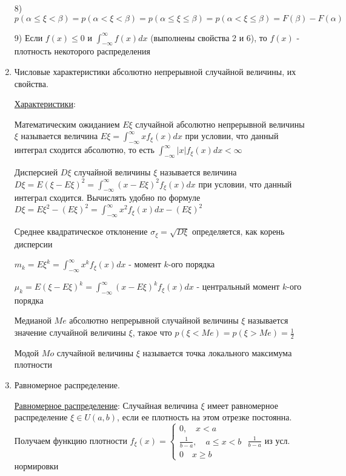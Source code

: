 \begin{enumerate}
    8) $p(\alpha \leq \xi < \beta) = p(\alpha < \xi < \beta) = p(\alpha \leq \xi \leq \beta) = p(\alpha < \xi \leq \beta) = F(\beta) - F(\alpha)$

    9) \Ths Если $f(x) \leq 0$ и $\int_{-\infty}^{\infty} f(x)dx$ (выполнены свойства 2 и 6), то $f(x)$ - плотность некоторого распределения

    \item Числовые характеристики абсолютно непрерывной случайной величины, их свойства.

    \hyperlink{attributesofcontinuousrandomvariable}{Характеристики}:

    Математическим ожиданием $E\xi$ случайной абсолютно непрерывной величины $\xi$ называется величина $E\xi = \int_{-\infty}^{\infty} xf_\xi(x) dx$ 
    при условии, что данный интеграл сходится абсолютно, то есть $\int_{-\infty}^\infty |x|f_\xi(x)dx < \infty$

    Дисперсией $D\xi$ случайной величины $\xi$ называется величина $D\xi = E(\xi - E\xi)^2 = \int_{-\infty}^\infty (x - E\xi)^2 f_\xi(x) dx$ при условии,
    что данный интеграл сходится. Вычислять удобно по формуле $D\xi = E\xi^2 - (E\xi)^2 = \int_{-\infty}^\infty x^2 f_\xi(x)dx - (E\xi)^2$

    Среднее квадратическое отклонение $\sigma_\xi = \sqrt{D\xi}$ определяется, как корень дисперсии

    $m_k = E\xi^k = \int_{-\infty}^\infty x^k f_\xi(x)dx$ - момент $k$-ого порядка

    $\mu_k = E(\xi - E\xi)^k = \int_{-\infty}^\infty (x - E\xi)^k f_\xi(x)dx$ - центральный момент $k$-ого порядка
    
    Медианой $Me$ абсолютно непрерывной случайной величины $\xi$ называется значение случайной величины $\xi$, такое что $p(\xi < Me) = p(\xi > Me) = \frac{1}{2}$
    
    Модой $Mo$ случайной величины $\xi$ называется точка локального максимума плотности

    \item Равномерное распределение. 

    \hyperlink{uniformdistribution}{Равномерное распределение}: Случайная величина $\xi$ имеет равномерное распределение $\xi \in U(a, b)$, если ее плотность
    на этом отрезке постоянна. Получаем функцию плотности $f_\xi(x) = \begin{cases}0, \quad x < a \\ \frac{1}{b - a}, \quad a \leq x < b \\ 0 \quad x \geq b\end{cases}$ \hfill {\scriptsize $\frac{1}{b - a}$ из усл. нормировки}


\end{enumerate}
